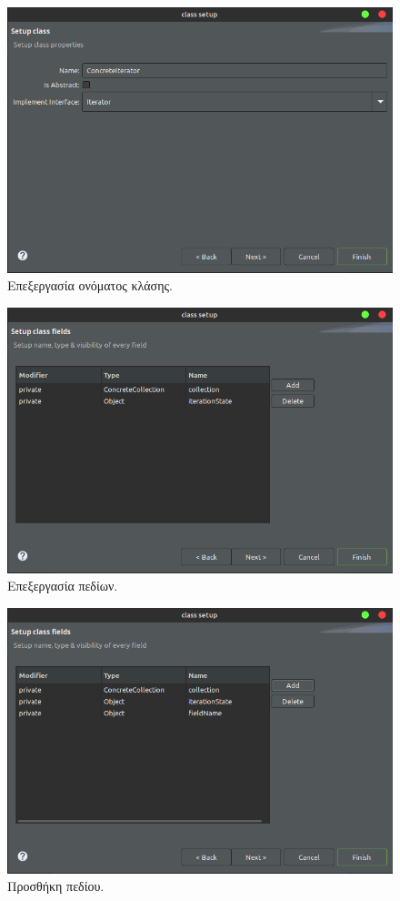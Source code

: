 \begin{figure}[H]
    \centering
    \includegraphics[width=1.0\textwidth]{Figures/class_name.png}
    \caption{Επεξεργασία ονόματος κλάσης.}
    \label{fig:class_name}
\end{figure}
\begin{figure}[H]
    \centering
    \includegraphics[width=1.0\textwidth]{Figures/edit_fields.png}
    \caption{Επεξεργασία πεδίων.}
    \label{fig:edit_fields}
\end{figure}
\begin{figure}[H]
    \centering
    \includegraphics[width=1.0\textwidth]{Figures/add_field.png}
    \caption{Προσθήκη πεδίου.}
    \label{fig:add_field}
\end{figure}
